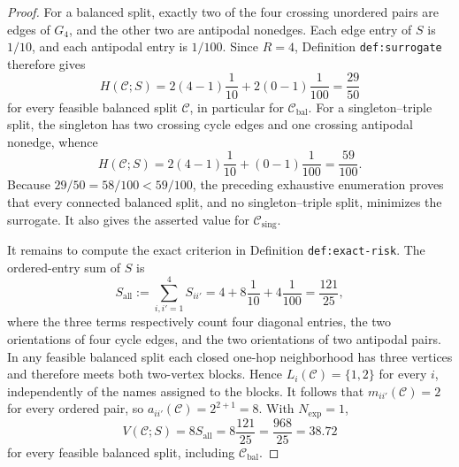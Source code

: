 \documentclass{article}
\begin{document}
\begin{proof}
For a balanced split, exactly two of the four crossing unordered pairs are edges of \(G_4\), and the other two are antipodal nonedges.  Each edge entry of \(S\) is \(1/10\), and each antipodal entry is \(1/100\).  Since \(R=4\), Definition \texttt{def:surrogate} therefore gives
\[
H(\mathcal C;S)
=2(4-1)\frac{1}{10}+2(0-1)\frac{1}{100}
=\frac{29}{50}
\]
for every feasible balanced split \(\mathcal C\), in particular for \(\mathcal C_{\mathrm{bal}}\).  For a singleton--triple split, the singleton has two crossing cycle edges and one crossing antipodal nonedge, whence
\[
H(\mathcal C;S)
=2(4-1)\frac{1}{10}+(0-1)\frac{1}{100}
=\frac{59}{100}.
\]
Because \(29/50=58/100<59/100\), the preceding exhaustive enumeration proves that every connected balanced split, and no singleton--triple split, minimizes the surrogate.  It also gives the asserted value for \(\mathcal C_{\mathrm{sing}}\).

It remains to compute the exact criterion in Definition \texttt{def:exact-risk}.  The ordered-entry sum of \(S\) is
\[
S_{\mathrm{all}}:=\sum_{i,i'=1}^4 S_{ii'}
=4+8\frac{1}{10}+4\frac{1}{100}
=\frac{121}{25},
\]
where the three terms respectively count four diagonal entries, the two orientations of four cycle edges, and the two orientations of two antipodal pairs.  In any feasible balanced split each closed one-hop neighborhood has three vertices and therefore meets both two-vertex blocks.  Hence \(L_i(\mathcal C)=\{1,2\}\) for every \(i\), independently of the names assigned to the blocks.  It follows that \(m_{ii'}(\mathcal C)=2\) for every ordered pair, so \(a_{ii'}(\mathcal C)=2^{2+1}=8\).  With \(N_{\exp}=1\),
\[
V(\mathcal C;S)=8S_{\mathrm{all}}
=8\frac{121}{25}
=\frac{968}{25}=38.72
\]
for every feasible balanced split, including \(\mathcal C_{\mathrm{bal}}\).


\end{proof}
\end{document}
